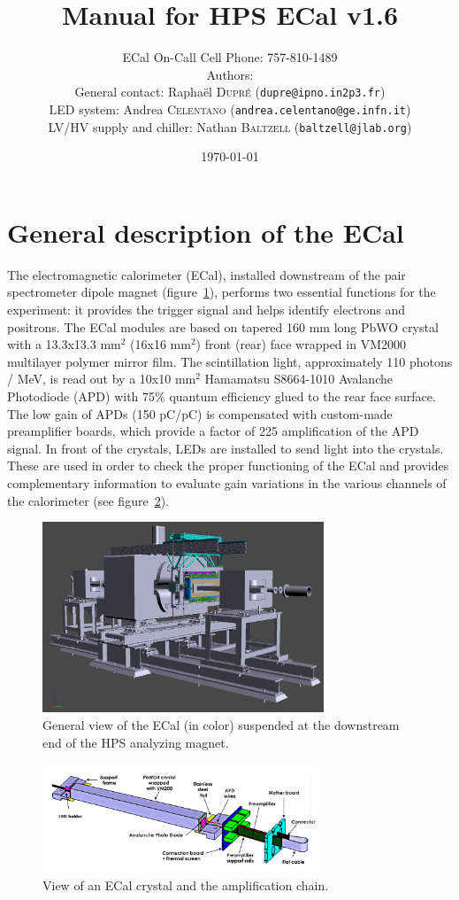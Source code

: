 \documentclass[12pt]{article}
\title{Manual for HPS ECal v1.6}
\author{ECal On-Call Cell Phone: 757-810-1489 \\ 
Authors: \\
General contact: Rapha\"el \textsc{Dupr\'e} (\texttt{dupre@ipno.in2p3.fr})\\ 
LED system: Andrea \textsc{Celentano} (\texttt{andrea.celentano@ge.infn.it})\\
LV/HV supply and chiller: Nathan \textsc{Baltzell} (\texttt{baltzell@jlab.org})\\
}
\date{\today} %
\begin{document}
\maketitle{}

   \section{General description of the ECal}


The electromagnetic calorimeter (ECal), installed downstream of the pair spectrometer dipole magnet (figure~\ref{GView}), performs two essential functions for the experiment: it provides the trigger signal and helps identify electrons and positrons. The ECal modules are based on tapered 160 mm long PbWO crystal with a 13.3x13.3 mm$^2$ (16x16 mm$^2$) front (rear) face wrapped in VM2000 multilayer polymer mirror film. The scintillation light, approximately 110 photons / MeV, is read out by a 10x10 mm$^2$ Hamamatsu S8664-1010 Avalanche Photodiode (APD) with 75\% quantum efficiency glued to the rear face surface. The low gain of APDs (150 pC/pC) is compensated with custom-made preamplifier boards, which provide a factor of 225 amplification of the APD signal. In front of the crystals, LEDs are installed to send light into the crystals. These are used in order to check the proper functioning of the ECal and provides complementary information to evaluate gain variations in the various channels of the calorimeter (see figure~\ref{AmplChain}).

\begin{figure}[hp]
\center
\includegraphics[width=0.75\textwidth]{pics/GView.png}
\caption{\small \label{GView} General view of the ECal (in color) suspended at the downstream end of the HPS analyzing magnet.}
\end{figure}

\begin{figure}[hp]
\center
\includegraphics[width=0.75\textwidth]{pics/CrystalAssembly.png}
\caption{\small \label{AmplChain} View of an ECal crystal and the amplification chain.}
\end{figure}
      
\end{document}
